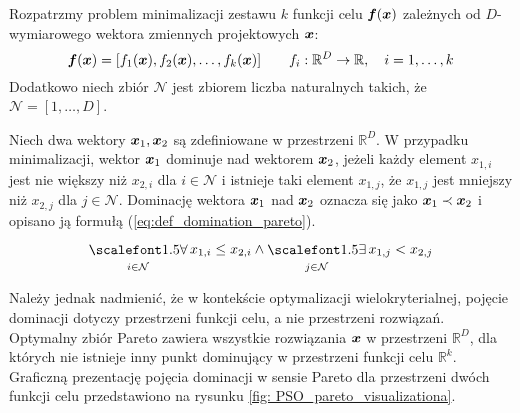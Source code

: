 Rozpatrzmy problem minimalizacji zestawu $k$ funkcji celu $\bm{f}(\bm{x})$ zależnych od $D$-wymiarowego wektora zmiennych projektowych $\bm{x}$:
\begin{equation}
	\bm{f}(\bm{x})=[f_1(\bm{x}),f_2(\bm{x}),\dots,f_k(\bm{x})] \qquad f_i:\mathbb{R}^D\rightarrow \mathbb{R},\quad i=1,\dots,k
\end{equation}
Dodatkowo niech zbiór $\mathcal{N}$ jest zbiorem liczba naturalnych takich, że $\mathcal{N}=[1,\dots,D]$.
\begin{definition}
Niech dwa wektory $\bm{x}_1, \bm{x}_2$ są zdefiniowane w przestrzeni $\mathbb{R}^D$. W przypadku minimalizacji, wektor $\bm{x}_1$ dominuje nad wektorem $\bm{x}_2$, jeżeli każdy element $x_{1,i}$ jest nie większy niż $x_{2,i}$ dla $i\in \mathcal{N}$ i istnieje taki element $x_{1,j}$, że $x_{1,j}$ jest mniejszy niż $x_{2,j}$ dla $j\in\mathcal{N}$. Dominację wektora $\bm{x}_1$ nad $\bm{x}_2$ oznacza się jako $\bm{x}_1\prec\bm{x}_2$ i opisano ją formułą (\ref{eq:def_domination_pareto}).
\begin{equation} \label{eq:def_domination_pareto}
	\bigforall_{i\in\mathcal{N}} x_{1,i}\le x_{2,i} \land \bigexists_{j\in\mathcal{N}} x_{1,j}<x_{2,j}
\end{equation}
\end{definition}


Należy jednak nadmienić, że w kontekście optymalizacji wielokryterialnej, pojęcie dominacji dotyczy przestrzeni funkcji celu, a nie przestrzeni rozwiązań. Optymalny zbiór Pareto zawiera wszystkie rozwiązania $\bm{x}$ w przestrzeni $\mathbb{R}^D$, dla których nie istnieje inny punkt dominujący w przestrzeni funkcji celu $\mathbb{R}^k$. Graficzną prezentację pojęcia dominacji w sensie Pareto dla przestrzeni dwóch funkcji celu przedstawiono na rysunku \ref{fig: PSO_pareto_visualizationa}.

